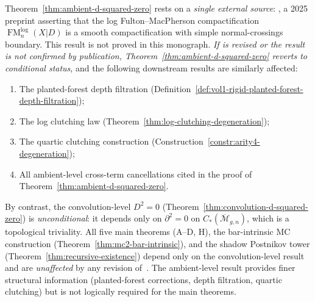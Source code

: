 \begin{remark}
\label{rem:mok-dependency}
\label{rem:mok25-dependents}
Theorem~\ref{thm:ambient-d-squared-zero} rests on a \emph{single
external source}: \cite[Theorem~3.3.1]{Mok25}, a 2025 preprint
asserting that the log Fulton--MacPherson compactification
$\operatorname{FM}_n^{\mathrm{log}}(X|D)$ is a smooth
compactification with simple normal-crossings boundary.
This result is not proved in this monograph.
\emph{If \cite{Mok25} is revised or the result is not confirmed
by publication, Theorem~\textup{\ref{thm:ambient-d-squared-zero}}
reverts to conditional status}, and the following downstream
results are similarly affected:
\begin{enumerate}[nosep]
\item The planted-forest depth filtration
  \textup{(}Definition~\textup{\ref{def:vol1-rigid-planted-forest-depth-filtration})};
\item The log clutching law
  \textup{(}Theorem~\textup{\ref{thm:log-clutching-degeneration})};
\item The quartic clutching construction
  \textup{(}Construction~\textup{\ref{constr:arity4-degeneration})};
\item All ambient-level cross-term cancellations cited in the
  proof of Theorem~\textup{\ref{thm:ambient-d-squared-zero}}.
\end{enumerate}
By contrast, the convolution-level $D^2 = 0$
(Theorem~\ref{thm:convolution-d-squared-zero}) is
\emph{unconditional}: it depends only on $\partial^2 = 0$ on
$C_*(\overline{\mathcal{M}}_{g,n})$, which is a topological
triviality.  All five main theorems (A--D, H), the bar-intrinsic
MC construction (Theorem~\ref{thm:mc2-bar-intrinsic}), and the
shadow Postnikov tower (Theorem~\ref{thm:recursive-existence})
depend only on the convolution-level result and are
\emph{unaffected} by any revision of~\cite{Mok25}.
The ambient-level result provides finer structural information
(planted-forest corrections, depth filtration, quartic clutching)
but is not logically required for the main theorems.
\end{remark}

